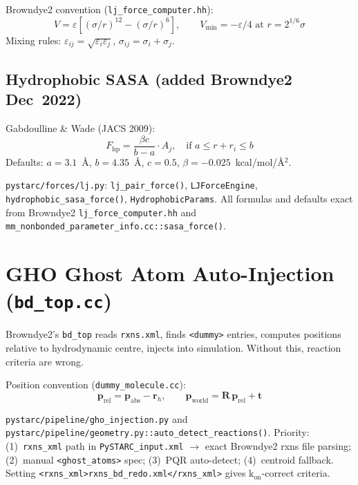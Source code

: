 \documentclass[12pt,a4paper]{article}
\newcommand{\OK}{\textcolor{cgreen}{\checkmark}}
\begin{document}
Browndye2 convention (\texttt{lj\_force\_computer.hh}):
\begin{equation}
V = \varepsilon\!\left[(\sigma/r)^{12} - (\sigma/r)^6\right],\qquad
V_\mathrm{min} = -\varepsilon/4 \text{ at } r = 2^{1/6}\sigma
\end{equation}
Mixing rules: $\varepsilon_{ij}=\sqrt{\varepsilon_i\varepsilon_j}$,
$\sigma_{ij} = \sigma_i+\sigma_j$.

\subsection{Hydrophobic SASA (added Browndye2 Dec~2022)}

Gabdoulline \& Wade (JACS 2009):
\begin{equation}
F_\mathrm{hp} = \frac{\beta c}{b-a}\cdot A_j, \quad
\text{if } a \leq r+r_i \leq b
\end{equation}
Defaults: $a=3.1$~\AA, $b=4.35$~\AA, $c=0.5$, $\beta=-0.025$~kcal/mol/\AA$^2$.

\begin{samebox}
\texttt{pystarc/forces/lj.py}: \texttt{lj\_pair\_force()}, \texttt{LJForceEngine},
\texttt{hydrophobic\_sasa\_force()}, \texttt{HydrophobicParams}.
All formulas and defaults exact from Browndye2 \texttt{lj\_force\_computer.hh}
and \texttt{mm\_nonbonded\_parameter\_info.cc::sasa\_force()}. \OK
\end{samebox}

\section{GHO Ghost Atom Auto-Injection (\texttt{bd\_top.cc})}

Browndye2's \texttt{bd\_top} reads \texttt{rxns.xml}, finds \texttt{<dummy>} entries,
computes positions relative to hydrodynamic centre, injects into simulation.
Without this, reaction criteria are wrong.

Position convention (\texttt{dummy\_molecule.cc}):
\begin{equation}
\mathbf{p}_\mathrm{rel} = \mathbf{p}_\mathrm{abs} - \mathbf{r}_h, \qquad
\mathbf{p}_\mathrm{world} = \mathbf{R}\,\mathbf{p}_\mathrm{rel} + \mathbf{t}
\end{equation}

\begin{samebox}
\texttt{pystarc/pipeline/gho\_injection.py} and
\texttt{pystarc/pipeline/geometry.py::auto\_detect\_reactions()}.
Priority: (1)~\texttt{rxns\_xml} path in \texttt{PySTARC\_input.xml} $\to$
exact Browndye2 rxns file parsing; (2)~manual \texttt{<ghost\_atoms>} spec;
(3)~PQR auto-detect; (4)~centroid fallback.
Setting \texttt{<rxns\_xml>rxns\_bd\_redo.xml</rxns\_xml>} gives k$_\mathrm{on}$-correct criteria. \OK
\end{samebox}
\end{document}
